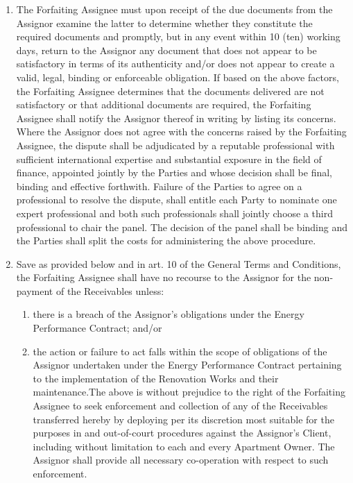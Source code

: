 \documentclass[a4paper]{article}
\begin{document}
\begin{multicols}{2}
  \begin{enumerate}
  \item{The Forfaiting Assignee must upon receipt of the due documents
      from the Assignor examine the latter to determine whether they
      constitute the required documents and promptly, but in any event
      within 10 (ten) working days, return to the Assignor any
      document that does not appear to be satisfactory in terms of its
      authenticity and/or does not appear to create a valid, legal,
      binding or enforceable obligation. If based on the above
      factors, the Forfaiting Assignee determines that the documents
      delivered are not satisfactory or that additional documents are
      required, the Forfaiting Assignee shall notify the Assignor
      thereof in writing by listing its concerns. Where the Assignor
      does not agree with the concerns raised by the Forfaiting
      Assignee, the dispute shall be adjudicated by a reputable
      professional with sufficient international expertise and
      substantial exposure in the field of finance, appointed jointly
      by the Parties and whose decision shall be final, binding and
      effective forthwith. Failure of the Parties to agree on a
      professional to resolve the dispute, shall entitle each Party to
      nominate one expert professional and both such professionals
      shall jointly choose a third professional to chair the
      panel. The decision of the panel shall be binding and the
      Parties shall split the costs for administering the above
      procedure.}

  \item{Save as provided below and in art. 10 of the General Terms and
      Conditions, the Forfaiting Assignee shall have no recourse to
      the Assignor for the non{-}payment of the Receivables unless:}

    \begin{enumerate}
    \item{there is a breach of the Assignor's obligations under the
        Energy Performance Contract; and/or}

    \item{the action or failure to act falls within the scope of
        obligations of the Assignor undertaken under the Energy
        Performance Contract pertaining to the implementation of the
        Renovation Works and their maintenance.The above is without
        prejudice to the right of the Forfaiting Assignee to seek
        enforcement and collection of any of the Receivables
        transferred hereby by deploying per its discretion most
        suitable for the purposes in and out{-}of{-}court procedures
        against the Assignor’s Client, including without limitation to
        each and every Apartment Owner. The Assignor shall provide all
        necessary co{-}operation with respect to such enforcement. }
    \end{enumerate}


\end{enumerate}
\end{multicols}
\end{document}
